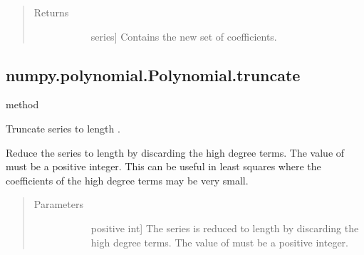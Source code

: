 \documentclass[letterpaper,10pt,english]{sphinxmanual}
\begin{document}
\begin{fulllineitems}
\begin{fulllineitems}
\begin{quote}
\begin{description}
\begin{description}
\end{description}

\item[{Returns}] \leavevmode\begin{description}
\item[{}] \leavevmode{[}series{]}
Contains the new set of coefficients.

\end{description}

\end{description}\end{quote}

\end{fulllineitems}



\subsection{numpy.polynomial.Polynomial.truncate}
\label{\detokenize{generated/generated/numpy.polynomial.Polynomial.truncate:numpy-polynomial-polynomial-truncate}}\label{\detokenize{generated/generated/numpy.polynomial.Polynomial.truncate::doc}}
method

\begin{fulllineitems}
\label{\detokenize{generated/generated/numpy.polynomial.Polynomial.truncate:numpy.polynomial.Polynomial.truncate}}
Truncate series to length .

Reduce the series to length  by discarding the high
degree terms. The value of  must be a positive integer. This
can be useful in least squares where the coefficients of the
high degree terms may be very small.
\begin{quote}\begin{description}
\item[{Parameters}] \leavevmode\begin{description}
\item[{}] \leavevmode{[}positive int{]}
The series is reduced to length  by discarding the high
degree terms. The value of  must be a positive integer.

\end{description}


\end{description}
\end{quote}
\end{fulllineitems}
\end{fulllineitems}
\end{document}
